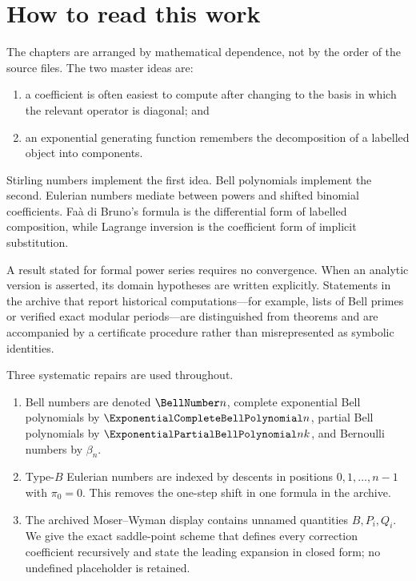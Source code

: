 \documentclass[11pt,a4paper,oneside,openany]{book}
\theoremstyle{definition}
\theoremstyle{remark}
\begin{document}
\chapter*{How to read this work}
The chapters are arranged by mathematical dependence, not by the order of the source
files.  The two master ideas are:
\begin{enumerate}
  \item a coefficient is often easiest to compute after changing to the basis in
        which the relevant operator is diagonal; and
  \item an exponential generating function remembers the decomposition of a
        labelled object into components.
\end{enumerate}
Stirling numbers implement the first idea.  Bell polynomials implement the second.
Eulerian numbers mediate between powers and shifted binomial coefficients.  Fa\`a di
Bruno's formula is the differential form of labelled composition, while Lagrange
inversion is the coefficient form of implicit substitution.

A result stated for formal power series requires no convergence.  When an analytic
version is asserted, its domain hypotheses are written explicitly.  Statements in
the archive that report historical computations---for example, lists of Bell
primes or verified exact modular periods---are distinguished from theorems and are
accompanied by a certificate procedure rather than misrepresented as symbolic
identities.

\begin{auditbox}
Three systematic repairs are used throughout.
\begin{enumerate}
\item Bell numbers are denoted $\BellNumber n$, complete exponential Bell polynomials by
      $\ExponentialCompleteBellPolynomial n$, partial Bell polynomials by $\ExponentialPartialBellPolynomial nk$, and Bernoulli numbers by
      $\beta_n$.
\item Type-$B$ Eulerian numbers are indexed by descents in positions
      $0,1,\ldots,n-1$ with $\pi_0=0$.  This removes the one-step shift in one formula
      in the archive.
\item The archived Moser--Wyman display contains unnamed quantities
      $B,P_i,Q_i$.  We give the exact saddle-point scheme that defines every
      correction coefficient recursively and state the leading expansion in closed
      form; no undefined placeholder is retained.
\end{enumerate}
\end{auditbox}
\end{document}
